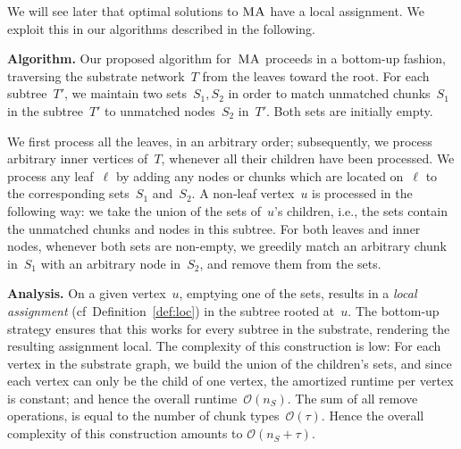 \documentclass[preprint,12pt]{elsarticle}
\newcommand{\ChunkType}{\tau}
\newcommand{\MA}{\textsc{MA}}
\newcommand{\Tree}{\ensuremath{T}}
\begin{document}


We will see later that
optimal solutions to
$\MA$ have a local assignment. We exploit this in our algorithms described
in the following.

\textbf{Algorithm.} Our proposed algorithm for~$\MA$
proceeds in a bottom-up fashion, traversing the substrate network~$\Tree$
from the leaves toward the root.
For each subtree~$\Tree'$, we maintain
two sets~$S_1,S_2$ in order to match unmatched
chunks~$S_1$ in the subtree~$\Tree'$ to unmatched
nodes~$S_2$ in~$\Tree'$. Both sets are initially empty.

We first process all the leaves, in an arbitrary order; subsequently, we process arbitrary inner vertices
of~$\Tree$, whenever all their children have been processed.
We process any leaf~$\ell$
by adding any
nodes or chunks which are located on~$\ell$ to the corresponding sets~$S_1$ and~$S_2$.
A non-leaf vertex~$u$ is processed in the following way: we take the union of
the sets of~$u$'s children, i.e., the sets contain the unmatched chunks and nodes
in this subtree.
For both leaves and inner nodes, whenever
both sets are non-empty, we greedily match an arbitrary chunk in~$S_1$ with an arbitrary node in~$S_2$,
and remove them from the sets.

\textbf{Analysis.} On a given vertex~$u$, emptying one of the sets, results in a \emph{local assignment} (cf~Definition~\ref{def:loc})
in the
subtree rooted at~$u$. The bottom-up strategy ensures that this works
for every subtree in the substrate, rendering the resulting assignment
local.
The complexity of this
construction is low: For each
vertex in the substrate graph,
we build the union of the
children's sets,
and since each vertex can only be the child of one vertex,
the amortized runtime per vertex is constant; and hence the overall
runtime~$\mathcal{O}(n_S)$. The sum of all remove operations, is equal to
the number of chunk types~$\mathcal{O}(\ChunkType)$.
Hence the overall complexity of this construction amounts to
$\mathcal{O}(n_S + \ChunkType)$.
\end{document}
